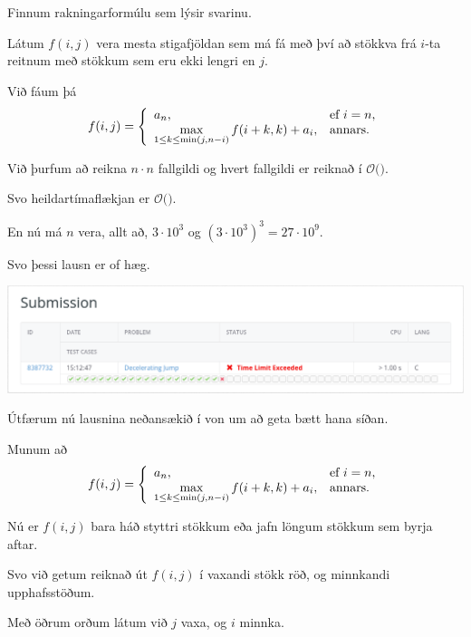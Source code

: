 {
	{
		\item<1-> Finnum rakningarformúlu sem lýsir svarinu.
		\item<2-> Látum $f(i, j)$ vera mesta stigafjöldan sem má fá með því að stökkva frá $i$-ta reitnum með stökkum sem eru ekki lengri en $j$.
		\item<3-> Við fáum þá
		\[
			f(i, j) = 
			\left \{
			\env{array}
			{
				{l l}
				a_n, & \text{ef $i = n$},\\
				\max\limits_{1 \leq k \leq \min(j, n - i)} f(i + k, k) + a_i, & \text{annars}.
			}
			\right .
		\]
	}
}

{
}

{
	{
		\item<1-> Við þurfum að reikna $n \cdot n$ fallgildi og hvert fallgildi er reiknað í $\mathcal{O}($\onslide<2->{$\,n\,$}$)$.
		\item<3-> Svo heildartímaflækjan er $\mathcal{O}($\onslide<4->{$n^3$}$)$.
		\item<5-> En nú má $n$ vera, allt að, $3 \cdot 10^3$ og $(3 \cdot 10^3)^3 = 27 \cdot 10^9$.
		\item<6-> Svo þessi lausn er of hæg.
		\item<7->[] \includegraphics[scale = 0.25]{fig/tle1.png}
	}
}

{
	{
		\item<1-> Útfærum nú lausnina neðansækið í von um að geta bætt hana síðan.
		\item<2-> Munum að
		\[
			f(i, j) = 
			\left \{
			\env{array}
			{
				{l l}
				a_n, & \text{ef $i = n$},\\
				\max\limits_{1 \leq k \leq \min(j, n - i)} f(i + k, k) + a_i, & \text{annars}.
			}
			\right .
		\]
		\item<3-> Nú er $f(i, j)$ bara háð styttri stökkum eða jafn löngum stökkum sem byrja aftar.
		\item<4-> Svo við getum reiknað út $f(i, j)$ í vaxandi stökk röð, og minnkandi upphafsstöðum.
		\item<5-> Með öðrum orðum látum við $j$ vaxa, og $i$ minnka.
	}
}

